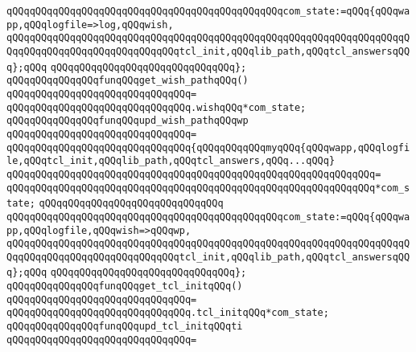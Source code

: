 \verb|qQQqqQQqqQQqqQQqqQQqqQQqqQQqqQQqqQQqqQQqqQQqqQQqcom_state:=qQQq{qQQqwapp,qQQqlogfile=>log,qQQqwish,|\newline
\verb|qQQqqQQqqQQqqQQqqQQqqQQqqQQqqQQqqQQqqQQqqQQqqQQqqQQqqQQqqQQqqQQqqQQqqQQqqQQqqQQqqQQqqQQqqQQqqQQqqQQqtcl_init,qQQqlib_path,qQQqtcl_answersqQQq};qQQq|\newline
\verb|qQQqqQQqqQQqqQQqqQQqqQQqqQQqqQQq};|\newline
\newline
\newline
\verb|qQQqqQQqqQQqqQQqfunqQQqget_wish_pathqQQq()|\newline
\verb|qQQqqQQqqQQqqQQqqQQqqQQqqQQqqQQq=|\newline
\verb|qQQqqQQqqQQqqQQqqQQqqQQqqQQqqQQq.wishqQQq*com_state;|\newline
\newline
\verb|qQQqqQQqqQQqqQQqfunqQQqupd_wish_pathqQQqwp|\newline
\verb|qQQqqQQqqQQqqQQqqQQqqQQqqQQqqQQq=|\newline
\verb|qQQqqQQqqQQqqQQqqQQqqQQqqQQqqQQq{qQQqqQQqqQQqmyqQQq{qQQqwapp,qQQqlogfile,qQQqtcl_init,qQQqlib_path,qQQqtcl_answers,qQQq...qQQq}|\newline
\verb|qQQqqQQqqQQqqQQqqQQqqQQqqQQqqQQqqQQqqQQqqQQqqQQqqQQqqQQqqQQqqQQq=|\newline
\verb|qQQqqQQqqQQqqQQqqQQqqQQqqQQqqQQqqQQqqQQqqQQqqQQqqQQqqQQqqQQqqQQq*com_state;|\newline
\verb|qQQqqQQqqQQqqQQqqQQqqQQqqQQqqQQq|\newline
\verb|qQQqqQQqqQQqqQQqqQQqqQQqqQQqqQQqqQQqqQQqqQQqqQQqcom_state:=qQQq{qQQqwapp,qQQqlogfile,qQQqwish=>qQQqwp,|\newline
\verb|qQQqqQQqqQQqqQQqqQQqqQQqqQQqqQQqqQQqqQQqqQQqqQQqqQQqqQQqqQQqqQQqqQQqqQQqqQQqqQQqqQQqqQQqqQQqqQQqqQQqtcl_init,qQQqlib_path,qQQqtcl_answersqQQq};qQQq|\newline
\verb|qQQqqQQqqQQqqQQqqQQqqQQqqQQqqQQq};|\newline
\newline
\verb|qQQqqQQqqQQqqQQqfunqQQqget_tcl_initqQQq()|\newline
\verb|qQQqqQQqqQQqqQQqqQQqqQQqqQQqqQQq=|\newline
\verb|qQQqqQQqqQQqqQQqqQQqqQQqqQQqqQQq.tcl_initqQQq*com_state;|\newline
\newline
\verb|qQQqqQQqqQQqqQQqfunqQQqupd_tcl_initqQQqti|\newline
\verb|qQQqqQQqqQQqqQQqqQQqqQQqqQQqqQQq=|\newline
